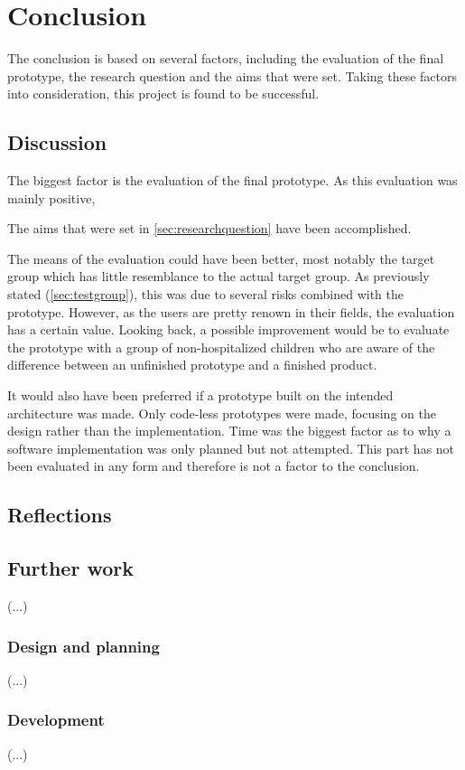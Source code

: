 \chapter{Conclusion}
\label{ch:conclusion}

The conclusion is based on several factors, including the evaluation of the final prototype, the research question and the aims that were set. Taking these factors into consideration, this project is found to be successful.

\section{Discussion}
\label{sec:discussion}


The biggest factor is the evaluation of the final prototype. As this evaluation was mainly positive, 



The aims that were set in \autoref{sec:researchquestion} have been accomplished. 

The means of the evaluation could have been better, most notably the target group which has little resemblance to the actual target group. As previously stated (\autoref{sec:testgroup}), this was due to several risks combined with the prototype. However, as the users are pretty renown in their fields, the evaluation has a certain value. Looking back, a possible improvement would be to evaluate the prototype with a group of non-hospitalized children who are aware of the difference between an unfinished prototype and a finished product.

It would also have been preferred if a prototype built on the intended architecture was made. Only code-less prototypes were made, focusing on the design rather than the implementation. Time was the biggest factor as to why a software implementation was only planned but not attempted. This part has not been evaluated in any form and therefore is not a factor to the conclusion.

\section{Reflections}
\label{sec:reflections}






\section{Further work}
\label{sec:furtherwork}

(...)

\subsection{Design and planning}

(...)

\subsection{Development}

(...)
